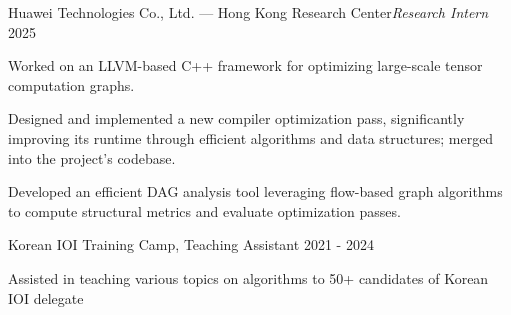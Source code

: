 
\begin{cventries2}

  \cventrynew
    {Huawei Technologies Co., Ltd. --- Hong Kong Research Center\newline\textnormal{\textit{Research Intern}}} %
    {2025} %
    {
      \begin{cvitems} %
        \item {Worked on an LLVM-based C++ framework for optimizing large-scale tensor computation graphs.}
        \item {Designed and implemented a new compiler optimization pass, significantly improving its runtime through efficient algorithms and data structures; merged into the project's codebase.}
        \item {Developed an efficient DAG analysis tool leveraging flow-based graph algorithms to compute structural metrics and evaluate optimization passes.}
      \end{cvitems}
    }


  \cventrynew
    {Korean IOI Training Camp, \textnormal{Teaching Assistant}} %
    {2021 - 2024} %
    {
      \begin{cvitems} %
        \item {Assisted in teaching various topics on algorithms to 50+ candidates of Korean IOI delegate}
      \end{cvitems}
    }





\end{cventries2}
